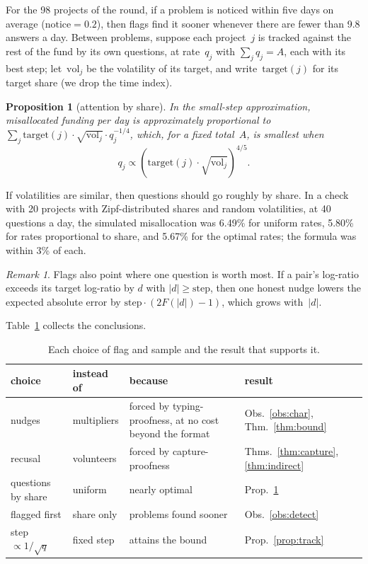 \documentclass[doubleblind]{ecai}
\newtheorem{proposition}[theorem]{Proposition}
\theoremstyle{remark}
\newtheorem{remark}{Remark}
\newcommand{\target}{\mathrm{target}}
\newcommand{\step}{\mathrm{step}}
\newcommand{\notice}{\mathrm{notice}}
\newcommand{\vol}{\mathrm{vol}}
\begin{document}
For the 98 projects of the round, if a problem is noticed within five days on average ($\notice = 0.2$), then flags find it sooner whenever there are fewer than 9.8 answers a day. Between problems, suppose each project~$j$ is tracked against the rest of the fund by its own questions, at rate~$q_j$ with $\sum_j q_j = A$, each with its best step; let~$\vol_j$ be the volatility of its target, and write~$\target(j)$ for its target share (we drop the time index).

\begin{proposition}[attention by share]\label{prop:alloc}
In the small-step approximation, misallocated funding per day is approximately proportional to $\sum_j \target(j)\cdot\sqrt{\vol_j}\cdot q_j^{-1/4}$, which, for a fixed total~$A$, is smallest when
\[
q_j \propto \left(\target(j)\cdot\sqrt{\vol_j}\right)^{4/5}.
\]
\end{proposition}

If volatilities are similar, then questions should go roughly by share. In a check with 20 projects with Zipf-distributed shares and random volatilities, at 40 questions a day, the simulated misallocation was 6.49\% for uniform rates, 5.80\% for rates proportional to share, and 5.67\% for the optimal rates; the formula was within 3\% of each.

\begin{remark}\label{rem:gain}
Flags also point where one question is worth most. If a pair's log-ratio exceeds its target log-ratio by $d$ with $|d|\ge\step$, then one honest nudge lowers the expected absolute error by $\step\cdot(2F(|d|)-1)$, which grows with~$|d|$.
\end{remark}

Table~\ref{tab:forced} collects the conclusions.

\begin{table}[t]
\caption{Each choice of flag and sample and the result that supports it.}\label{tab:forced}
\centering\small
\begin{tabular}{@{}>{\raggedright\arraybackslash}p{1.6cm}>{\raggedright\arraybackslash}p{1.4cm}>{\raggedright\arraybackslash}p{2.6cm}>{\raggedright\arraybackslash}p{1.3cm}@{}}
\toprule
choice & instead of & because & result \\
\midrule
nudges & multipliers & forced by typing-proofness, at no cost beyond the format & Obs.~\ref{obs:char}, Thm.~\ref{thm:bound} \\
recusal & volunteers & forced by capture-proofness & Thms.~\ref{thm:capture}, \ref{thm:indirect} \\
questions by share & uniform & nearly optimal & Prop.~\ref{prop:alloc} \\
flagged first & share only & problems found sooner & Obs.~\ref{obs:detect} \\
step $\propto 1/\sqrt{q}$ & fixed step & attains the bound & Prop.~\ref{prop:track} \\
\bottomrule
\end{tabular}
\end{table}
\end{document}
